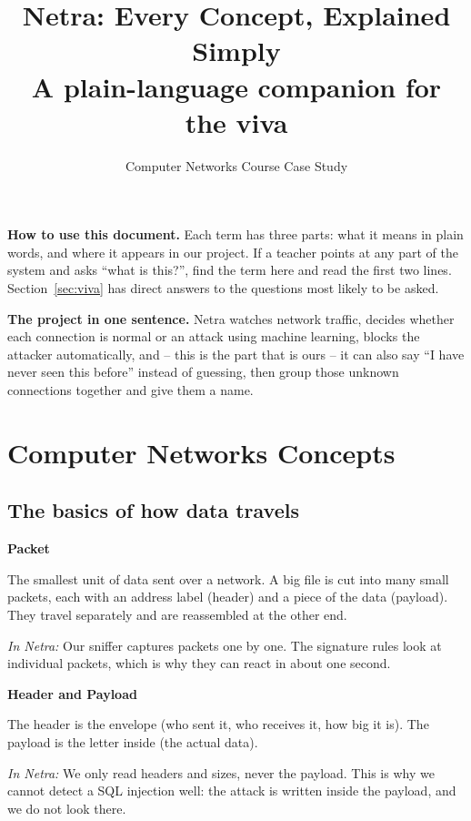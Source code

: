 \documentclass[11pt,a4paper]{article}
\title{\vspace{-1.2cm}\textbf{Netra: Every Concept, Explained Simply}\\[2mm]
\large A plain-language companion for the viva}
\author{Computer Networks Course Case Study}
\date{}
\newcommand{\term}[3]{%
  \par\medskip\noindent\textbf{\color{ink}#1}\par
  \nobreak\vspace{1pt}#2\par
  \nobreak\vspace{1pt}\textit{\color{accent}In Netra:} #3\par}
\begin{document}
\maketitle

\begin{saybox}
\textbf{How to use this document.} Each term has three parts: what it means in
plain words, and where it appears in our project. If a teacher points at any part
of the system and asks ``what is this?'', find the term here and read the first
two lines. Section~\ref{sec:viva} has direct answers to the questions most likely
to be asked.
\end{saybox}

\begin{saybox}
\textbf{The project in one sentence.} Netra watches network traffic, decides
whether each connection is normal or an attack using machine learning, blocks the
attacker automatically, and -- this is the part that is ours -- it can also say
``I have never seen this before'' instead of guessing, then group those unknown
connections together and give them a name.
\end{saybox}

\tableofcontents
\newpage

\section{Computer Networks Concepts}

\subsection{The basics of how data travels}

\term{Packet}
{The smallest unit of data sent over a network. A big file is cut into many
small packets, each with an address label (header) and a piece of the data
(payload). They travel separately and are reassembled at the other end.}
{Our sniffer captures packets one by one. The signature rules look at individual
packets, which is why they can react in about one second.}

\term{Header and Payload}
{The header is the envelope (who sent it, who receives it, how big it is). The
payload is the letter inside (the actual data).}
{We only read headers and sizes, never the payload. This is why we cannot detect
a SQL injection well: the attack is written inside the payload, and we do not
look there.}
\end{document}
